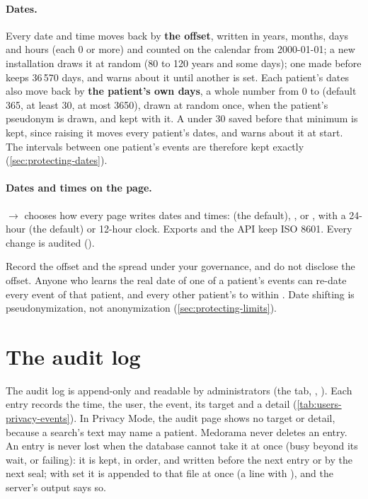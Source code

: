 \paragraph{Dates.} Every date and time moves back by \textbf{the offset}, written in
years, months, days and hours (each 0 or more) and counted on the calendar from 2000-01-01; a new
installation draws it at random (80 to 120 years and some days); one made before keeps 36\,570
days, and  warns about it until another is set. Each patient's dates also move back by \textbf{the
patient's own days}, a whole number from 0 to  (default 365, at least 30, at
most 3650), drawn at random once, when the patient's pseudonym is drawn, and kept with it. A
 under 30 saved before that minimum is kept, since raising it moves every
patient's dates, and  warns about it at start. The intervals between one patient's events are therefore kept exactly
(\cref{sec:protecting-dates}).

\paragraph{Dates and times on the page.}  $\rightarrow$  chooses how
every page writes dates and times:  (the default), ,
 or , with a 24-hour (the default) or 12-hour clock. Exports and
the API keep ISO 8601. Every change is audited ().

\begin{note}
Record the offset and the spread under your governance, and do not disclose the offset. Anyone
who learns the real date of one of a patient's events can re-date every event of that patient,
and every other patient's to within . Date shifting is pseudonymization, not
anonymization (\cref{sec:protecting-limits}).
\end{note}

\section{The audit log}
\label{sec:users-privacy-audit}

The audit log is append-only and readable by administrators (the  tab,
, ). Each entry records the time, the user, the event, its
target and a detail (\cref{tab:users-privacy-events}). In Privacy Mode, the audit page shows no
target or detail, because a search's text may name a patient. Medorama never deletes an entry.
An entry is never lost when the database cannot take it at once (busy beyond its wait, or
failing): it is kept, in order, and written before the next entry or by the next seal; with
 set it is appended to that file at once (a line with
), and the server's output says so.

